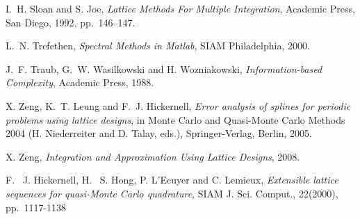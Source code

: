 \documentclass[article]{siamltex}
\begin{document}
\begin{thebibliography}{10}
{\sc I.~H. Sloan and S. Joe}, {\em Lattice Methods For Multiple
Integration}, Academic Press, San Diego, 1992, pp.~146--147.

 {\sc L.~N. Trefethen}, {\em Spectral
Methods in Matlab}, SIAM Philadelphia, 2000.

 {\sc J.~F. Traub, G.~W. Wasilkowski and H. Wozniakowski}, {\em Information-based Complexity}, Academic Press, 1988.

 {\sc X. Zeng, K.~T. Leung and F.~J. Hickernell},
  {\em Error analysis of splines for periodic problems using
  lattice designs}, in {M}onte {C}arlo and
Quasi-{M}onte {C}arlo Methods 2004 (H. Niederreiter and D. Talay,
eds.), Springer-Verlag, Berlin, 2005.

 {\sc X. Zeng},
  {\em Integration and Approximation Using Lattice Designs}, 2008.

{\sc F. ~J. Hickernell, H. ~S. Hong, P. L'Ecuyer  and  C. Lemieux},
{\em Extensible lattice sequences for quasi-{M}onte {C}arlo quadrature},
SIAM J. Sci. Comput., 22(2000), pp.~1117-1138
\end{thebibliography}
\end{document}
